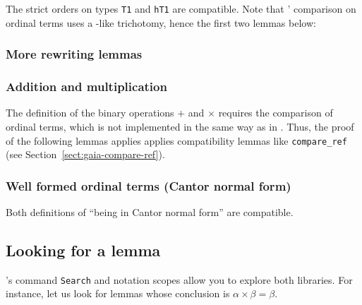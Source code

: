 The  strict orders on types \texttt{T1} and \texttt{hT1} are
compatible.
Note that \HydrasLib' comparison on ordinal terms uses a
\stdpp-like trichotomy, hence the first two lemmas below:

\label{sect:gaia-compare-ref}



\subsubsection{More rewriting lemmas}






\subsubsection{Addition and multiplication}
\label{sect:plus-mult-gaia-hydras}

The definition of the binary operations $+$ and $\times$
requires the comparison of ordinal terms, which is not implemented in \gaiaHydras  the same way as in \HydrasLib. Thus, the proof of the following lemmas applies applies
compatibility lemmas like \texttt{compare\_ref} (see Section~\vref{sect:gaia-compare-ref}).




\subsubsection{Well formed ordinal terms (Cantor normal form)}
\label{nf-gaia-compat}
Both definitions of ``being in Cantor normal form'' are
compatible.




\subsection{Looking for a lemma}
\coq's command \texttt{Search} and notation scopes allow you to explore both libraries.
For instance, let us look for lemmas whose conclusion is
$\alpha \times \beta=\beta$.

